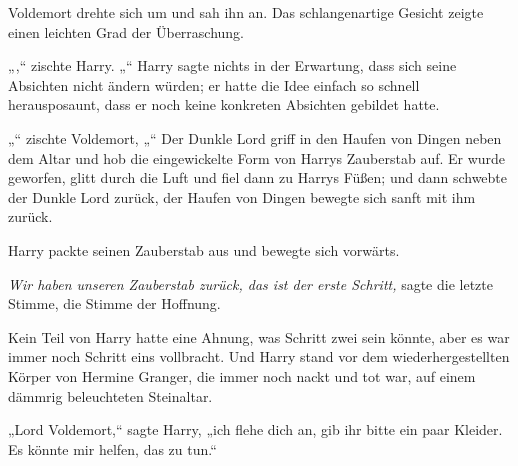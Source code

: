 Voldemort drehte sich um und sah ihn an. Das schlangenartige Gesicht zeigte einen leichten Grad der Überraschung.

„,“ zischte Harry. „“
Harry sagte nichts in der Erwartung, dass sich seine Absichten nicht ändern würden; er hatte die Idee einfach so schnell herausposaunt, dass er noch keine konkreten Absichten gebildet hatte.

„“ zischte Voldemort, „“
Der Dunkle Lord griff in den Haufen von Dingen neben dem Altar und hob die eingewickelte Form von Harrys Zauberstab auf. Er wurde geworfen, glitt durch die Luft und fiel dann zu Harrys Füßen; und dann schwebte der Dunkle Lord zurück, der Haufen von Dingen bewegte sich sanft mit ihm zurück.

Harry packte seinen Zauberstab aus und bewegte sich vorwärts.

\emph{Wir haben unseren Zauberstab zurück, das ist der erste Schritt,} sagte die letzte Stimme, die Stimme der Hoffnung.

Kein Teil von Harry hatte eine Ahnung, was Schritt zwei sein könnte, aber es war immer noch Schritt eins vollbracht.
Und Harry stand vor dem wiederhergestellten Körper von Hermine Granger, die immer noch nackt und tot war, auf einem dämmrig beleuchteten Steinaltar.

„Lord Voldemort,“ sagte Harry, „ich flehe dich an, gib ihr bitte ein paar Kleider. Es könnte mir helfen, das zu tun.“

